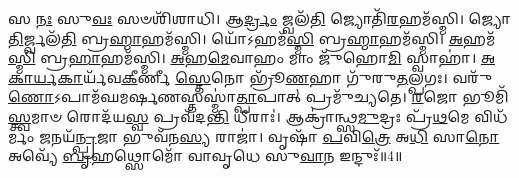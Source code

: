 𑌸 \ul{𑌨𑌃} 𑌸𑍁\-\ul{𑌵𑌃} 𑌸𑍞𑌶𑌿᳴𑌶𑌾𑌧𑌿। 𑌆\-\ul{𑌰𑍍𑌦𑍍𑌰𑌂} 𑌜𑍍𑌵𑌲᳴\-\ul{𑌤𑌿} 𑌜𑍍𑌯𑍋𑌤𑌿᳴\-\ul{𑌰}\-𑌹𑌮᳴𑌸𑍍𑌮𑌿। 𑌜𑍍𑌯𑍋\-\ul{𑌤𑌿}\-𑌰𑍍𑌜𑍍𑌵𑌲᳴\-\ul{𑌤𑌿} 𑌬𑍍𑌰\-\ul{𑌹𑍍𑌮𑌾}\-𑌹𑌮᳴𑌸𑍍𑌮𑌿। 𑌯𑍋᳴𑌽𑌹𑌮᳴\-\ul{𑌸𑍍𑌮𑌿} 𑌬𑍍𑌰\-\ul{𑌹𑍍𑌮𑌾}\-𑌹𑌮᳴𑌸𑍍𑌮𑌿। \ul{𑌅}\-𑌹𑌮᳴\-\ul{𑌸𑍍𑌮𑌿} 𑌬𑍍𑌰\-\ul{𑌹𑌾}\-𑌹𑌮᳴𑌸𑍍𑌮𑌿। \ul{𑌅}\-𑌹\-\ul{𑌮𑍇}\-𑌵𑌾𑌹𑌂 𑌮𑌾𑌂 𑌜𑍁᳴𑌹𑍋\-\ul{𑌮𑌿} 𑌸𑍍𑌵𑌾𑌹𑌾॑।
 \ul{𑌅}\-\-\ul{𑌕𑌾}\-\-\ul{𑌰𑍍𑌯}\-\-\ul{𑌕𑌾}\-𑌰𑍍𑌯᳴𑌵\-\ul{𑌕𑍀}\-𑌰𑍍𑌣𑍀 \ul{𑌸𑍍𑌤𑍇}\-𑌨𑍋 𑌭𑍍𑌰𑍂᳴\-\ul{𑌣}\-𑌹𑌾 𑌗𑍁᳴𑌰𑍁\-\ul{𑌤}\-𑌲𑍍𑌪𑌗𑌃। 𑌵𑌰𑍁᳴\-\ul{𑌣𑍋}\-𑌽𑌪𑌾𑌮᳴𑌘\-𑌮𑌰𑍍\mbox{}\-\ul{𑌷}\-𑌣𑌸𑍍𑌤𑌸𑍍𑌮𑌾॑\-\ul{𑌤𑍍𑌪𑌾}\-𑌪𑌾𑌤𑍍 𑌪𑍍𑌰𑌮𑍁᳴𑌚𑍍𑌯𑌤𑍇। \ul{𑌰}\-𑌜𑍋 𑌭𑍂𑌮𑌿᳴\-\ul{𑌸𑍍𑌤𑍍𑌵}\-𑌮𑌾𑍞 𑌰𑍋𑌦᳴𑌯\-\ul{𑌸𑍍𑌵} 𑌪𑍍𑌰𑌵᳴𑌦\-\ul{𑌨𑍍𑌤𑌿} 𑌧𑍀𑌰𑌾𑌃॑। 𑌆𑌕𑍍𑌰𑌾॑𑌨𑍍𑌥𑍍𑌸\-\ul{𑌮𑍁}\-𑌦𑍍𑌰𑌃 𑌪𑍍𑌰᳴\-\ul{𑌥}\-𑌮𑍇 𑌵𑌿𑌧᳴𑌰𑍍𑌮𑌂 \ul{𑌜}\-𑌨𑌯᳴\-\ul{𑌨𑍍𑌪𑍍𑌰}\-𑌜𑌾 𑌭𑍁𑌵᳴𑌨\-\ul{𑌸𑍍𑌯} 𑌰𑌾𑌜𑌾॑। 𑌵𑍃𑌷𑌾᳴ \ul{𑌪}\-𑌵𑌿\-\ul{𑌤𑍍𑌰𑍇} 𑌅\-\ul{𑌧𑌿} 𑌸𑌾\-\ul{𑌨𑍋} 𑌅𑌵𑍍𑌯𑍇᳴ \ul{𑌬𑍃}\-𑌹𑌥𑍍𑌸𑍋𑌮𑍋᳴ 𑌵𑌾𑌵𑍃𑌧𑍇 𑌸𑍁\-\ul{𑌵𑌾}\-𑌨 𑌇𑌨𑍍𑌦𑍁𑌃᳴॥4॥
